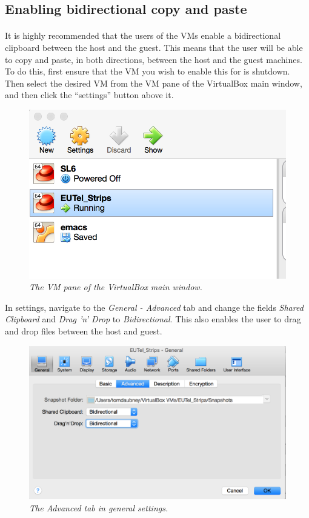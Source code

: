 \documentclass[11pt]{article}
\begin{document}
\subsection{Enabling bidirectional copy and paste}
\paragraph{}
It is highly recommended that the users of the VMs enable a bidirectional clipboard between the host and the guest. This means that the user will be able to copy and paste, in both directions, between the host and the guest machines. To do this, first ensure that the VM you wish to enable this for is shutdown. Then select the desired VM from the VM pane of the VirtualBox main window, and then click the ``settings'' button above it.
\begin{figure}[!ht]
	\centering
	\includegraphics[scale=0.4]{images/copypaste1.png}
	\caption{\textit{The VM pane of the VirtualBox main window.}}
\end{figure}
In settings, navigate to the \textit{General - Advanced} tab and change the fields \textit{Shared Clipboard} and \textit{Drag 'n' Drop} to \textit{Bidirectional}. This also enables the user to drag and drop files between the host and guest.
\begin{figure}[!ht]
	\centering
	\includegraphics[scale=0.3]{images/copypaste2.png}
	\caption{\textit{The Advanced tab in general settings.}}
\end{figure}
\end{document}

